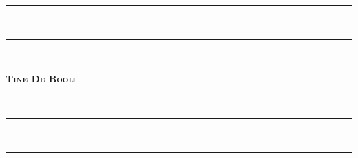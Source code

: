 {\begingroup
\iftablet
{} %
\else
{} %
\fi
\noindent
\hspace{-8mm}\parbox{12cm}{\rule{10cm}{1.6pt}\vspace*{-\baselineskip}\vspace*{2pt}\\ %
\rule{10cm}{0.4pt}\\[0.2\baselineskip] %
\parbox[c][2cm]{10cm}{\centering\textsc{\LARGE \textbf{Tine De Booij}}\par}\\ %

 \noindent\rule{10cm}{0.4pt}\vspace*{-\baselineskip}\vspace{3.2pt}\\ %
\rule{10cm}{1.6pt}}\\[\baselineskip] %
\endgroup}
\cleardoublepage
